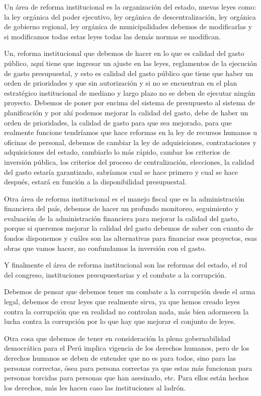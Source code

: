 \documentclass[
  letterpaper,
  DIV=11,
  numbers=noendperiod]{scrartcl}
\begin{document}
Un área de reforma institucional es la organización del estado, nuevas
leyes como: la ley orgánica del poder ejecutivo, ley orgánica de
descentralización, ley orgánica de gobierno regional, ley orgánica de
municipalidades debemos de modificarlas y si modificamos todas estas
leyes todas las demás normas se modifican.

Un, reforma institucional que debemos de hacer en lo que es calidad del
gasto público, aquí tiene que ingresar un ajuste en las leyes,
reglamentos de la ejecución de gasto presupuestal, y esto es calidad del
gasto público que tiene que haber un orden de prioridades y que sin
autorización y si no se encuentran en el plan estratégico institucional
de mediano y largo plazo no se deben de ejecutar ningún proyecto.
Debemos de poner por encima del sistema de presupuesto al sistema de
planificación y por ahí podemos mejorar la calidad del gasto, debe de
haber un orden de prioridades, la calidad de gasto para que sea
mejorado, para que realmente funcione tendríamos que hace reformas en la
ley de recursos humanos u oficinas de personal, debemos de cambiar la
ley de adquisiciones, contrataciones y adquisiciones del estado,
cambiarlo lo más rápido, cambar los criterios de inversión pública, los
criterios del proceso de centralización, elecciones, la calidad del
gasto estaría garantizado, sabríamos cual se hace primero y cual se hace
después, estará en función a la disponibilidad presupuestal.

Otra área de reforma institucional es el manejo fiscal que es la
administración financiera del país, debemos de hacer un profundo
monitoreo, seguimiento y evaluación de la administración financiera para
mejorar la calidad del gasto, porque si queremos mejorar la calidad del
gasto debemos de saber con cuanto de fondos disponemos y cuáles son las
alternativas para financiar esos proyectos, esas obras que vamos hacer,
no confundamos la inversión con el gasto.

Y finalmente el área de reforma institucional son las reformas del
estado, el rol del congreso, instituciones presupuestarias y el combate
a la corrupción.

Debemos de pensar que debemos tener un combate a la corrupción desde el
arma legal, debemos de crear leyes que realmente sirva, ya que hemos
creado leyes contra la corrupción que en realidad no controlan nada, más
bien adormecen la lucha contra la corrupción por lo que hay que mejorar
el conjunto de leyes.

Otra cosa que debemos de tener en consideración la plena gobernabilidad
democrática para el Perú implica vigencia de los derechos humanos, pero
de los derechos humanos se deben de entender que no es para todos, sino
para las personas correctas, ósea para persona correctas ya que estas
más funcionan para personas torcidas para personas que han asesinado,
etc. Para ellos están hechos los derechos, más les hacen caso las
instituciones al ladrón.
\end{document}

